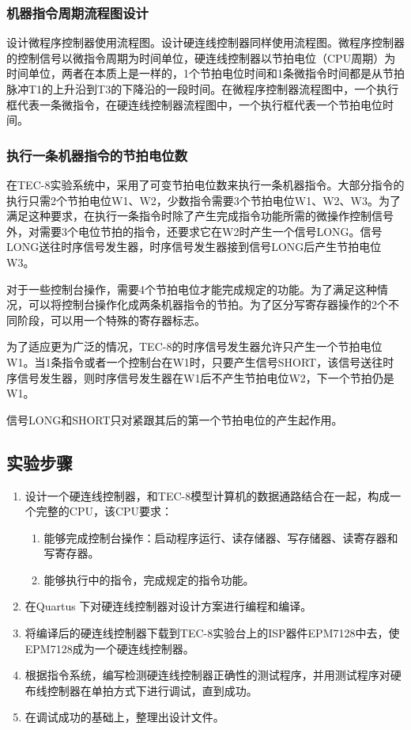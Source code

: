 \documentclass[lang=cn,11pt,a4paper,cite=authornum]{paper}
\begin{document}
\subsubsection{机器指令周期流程图设计}

设计微程序控制器使用流程图。设计硬连线控制器同样使用流程图。微程序控制器的控制信号以微指令周期为时间单位，硬连线控制器以节拍电位（CPU周期）为时间单位，两者在本质上是一样的，1个节拍电位时间和1条微指令时间都是从节拍脉冲T1的上升沿到T3的下降沿的一段时间。在微程序控制器流程图中，一个执行框代表一条微指令，在硬连线控制器流程图中，一个执行框代表一个节拍电位时间。

\subsubsection{执行一条机器指令的节拍电位数}

在TEC-8实验系统中，采用了可变节拍电位数来执行一条机器指令。大部分指令的执行只需2个节拍电位W1、W2，少数指令需要3个节拍电位W1、W2、W3。为了满足这种要求，在执行一条指令时除了产生完成指令功能所需的微操作控制信号外，对需要3个电位节拍的指令，还要求它在W2时产生一个信号LONG。信号LONG送往时序信号发生器，时序信号发生器接到信号LONG后产生节拍电位W3。

对于一些控制台操作，需要4个节拍电位才能完成规定的功能。为了满足这种情况，可以将控制台操作化成两条机器指令的节拍。为了区分写寄存器操作的2个不同阶段，可以用一个特殊的寄存器标志。

为了适应更为广泛的情况，TEC-8的时序信号发生器允许只产生一个节拍电位W1。当1条指令或者一个控制台在W1时，只要产生信号SHORT，该信号送往时序信号发生器，则时序信号发生器在W1后不产生节拍电位W2，下一个节拍仍是W1。

信号LONG和SHORT只对紧跟其后的第一个节拍电位的产生起作用。


\subsection{实验步骤}

\begin{enumerate}
    \item 设计一个硬连线控制器，和TEC-8模型计算机的数据通路结合在一起，构成一个完整的CPU，该CPU要求：
    \begin{enumerate}
        \item 能够完成控制台操作：启动程序运行、读存储器、写存储器、读寄存器和写寄存器。
        \item 能够执行中的指令，完成规定的指令功能。
    \end{enumerate}
    \item 在Quartus \uppercase\expandafter{}下对硬连线控制器对设计方案进行编程和编译。
    \item 将编译后的硬连线控制器下载到TEC-8实验台上的ISP器件EPM7128中去，使EPM7128成为一个硬连线控制器。
    \item 根据指令系统，编写检测硬连线控制器正确性的测试程序，并用测试程序对硬布线控制器在单拍方式下进行调试，直到成功。
    \item 在调试成功的基础上，整理出设计文件。
\end{enumerate}
\end{document}
